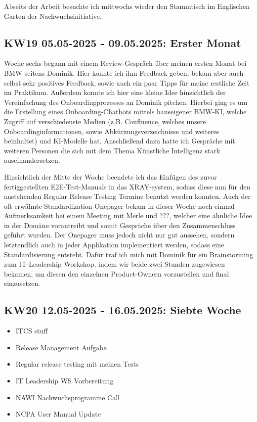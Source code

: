 Abseits der Arbeit besuchte ich mittwochs wieder den Stammtisch im Englischen Garten der Nachwuchsinitiative.


\subsection{KW19 05.05-2025 - 09.05.2025: Erster Monat}
Woche sechs begann mit einem Review-Gespräch über meinen ersten Monat bei BMW seitens Dominik. 
Hier konnte ich ihm Feedback geben, bekam aber auch selbst sehr positives Feedback, sowie auch ein paar Tipps für meine restliche Zeit im Praktikum.
Außerdem konnte ich hier eine kleine Idee hinsichtlich der Vereinfachung des Onboardingprozesses an Dominik pitchen. 
Hierbei ging es um die Erstellung eines Onboarding-Chatbots mittels hauseigener BMW-KI, welche Zugriff auf verschiedenste Medien (z.B. Confluence, welches unsere Onboardinginformationen, sowie Abkürzungsverzeichnisse und weiteres beinhaltet) und KI-Modelle hat.
Anschließend dazu hatte ich Gespräche mit weiteren Personen die sich mit dem Thema Künstliche Intelligenz stark auseinandersetzen.

Hinsichtlich der Mitte der Woche beendete ich das Einfügen des zuvor fertiggestellten \ac{E2E}-Test-Manuals in das XRAY-system, sodass diese nun für den anstehenden Regular Release Testing Termine benutzt werden konnten.
Auch der oft erwähnte Standardization-Onepager bekam in dieser Woche noch einmal Aufmerksamkeit bei einem Meeting mit Merle und ???, welcher eine ähnliche Idee in der Domäne vorantreibt und somit Gespräche über den Zusammenschluss geführt wurden.
Der Onepager muss jedoch nicht nur gut aussehen, sondern letztendlich auch in jeder Applikation implementiert werden, sodass eine Standardisierung entsteht.
Dafür traf ich mich mit Dominik für ein Brainstorming zum IT-Leadership Workshop, indem wir beide zwei Stunden zugewiesen bekamen, um diesen den einzelnen Product-Ownern vorzustellen und final einzusetzen.



\subsection{KW20 12.05-2025 - 16.05.2025: Siebte Woche}
\begin{itemize}
  \item ITCS stuff
  \item Release Management Aufgabe
  \item Regular release testing mit meinen Tests
  \item IT Leadership WS Vorbereitung
  \item NAWI Nachwuchsprogramme Call
  \item NCPA User Manual Update
\end{itemize}

